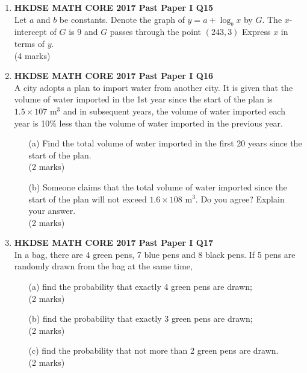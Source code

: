 \documentclass[12pt]{article}
\begin{document}
\begin{enumerate}
	\item \textbf{HKDSE MATH CORE 2017 Past Paper I Q15}\\
	Let $a$ and $b$ be constants. Denote the graph of $y = a + \log_b{x}$ by $G$. The $x$-intercept of $G$ is 9 and $G$ passes through the point $(243, 3)$ Express $x$ in terms of $y$. \\(4 marks)

	\item \textbf{HKDSE MATH CORE 2017 Past Paper I Q16}\\
	A city adopts a plan to import water from another city. It is given that the volume of water imported in the 1st year since the start of the plan is $1.5 \times 107$ m$^3$ and in subsequent years, the volume of water imported each year is 10\% less than the volume of water imported in the previous year.
	\begin{enumerate}
		\item[(a)] Find the total volume of water imported in the first 20 years since the start of the plan. \\(2 marks) 
		\item[(b)] Someone claims that the total volume of water imported since the start of the plan will not exceed $1.6 \times 108$ m$^3$. Do you agree? Explain your answer. \\ (2 marks)
	\end{enumerate}

	\item \textbf{HKDSE MATH CORE 2017 Past Paper I Q17}\\
	In a bag, there are 4 green pens, 7 blue pens and 8 black pens. If 5 pens are randomly drawn from the bag at the same time,
	\begin{enumerate}
		\item[(a)] find the probability that exactly 4 green pens are drawn; \\(2 marks)
		\item[(b)] find the probability that exactly 3 green pens are drawn; \\(2 marks)
		\item[(c)] find the probability that not more than 2 green pens are drawn. \\(2 marks)
	\end{enumerate}


\end{enumerate}
\end{document}
